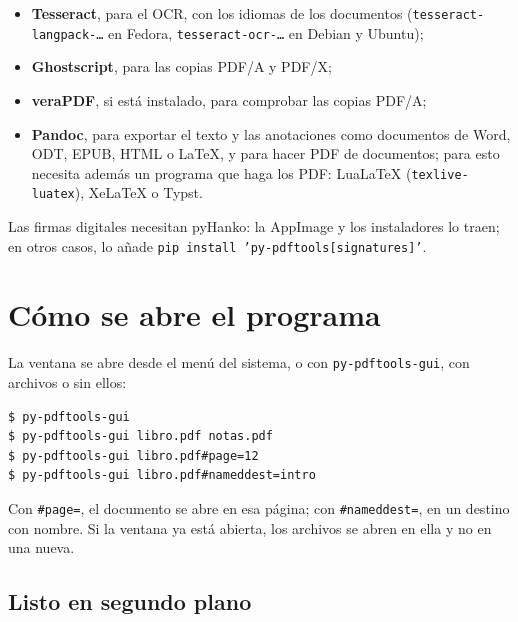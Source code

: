 \documentclass[12pt,
              article,
              oneside
              ]{memoir}
\begin{document}
%
\begin{itemize}
\item \textbf{Tesseract}, para el OCR, con los idiomas de los documentos
  (\texttt{tesseract-langpack-\ldots} en Fedora,
  \texttt{tesseract-ocr-\ldots} en Debian y Ubuntu);
\item \textbf{Ghostscript}, para las copias PDF/A y PDF/X;
\item \textbf{veraPDF}, si está instalado, para comprobar las copias PDF/A;
\item \textbf{Pandoc}, para exportar el texto y las anotaciones como
  documentos de Word, ODT, EPUB, HTML o LaTeX, y para hacer PDF de
  documentos; para esto necesita además un programa que haga los PDF:
  LuaLaTeX (\texttt{texlive-luatex}), XeLaTeX o Typst.
\end{itemize}

\noindent{}%
Las firmas digitales necesitan pyHanko: la AppImage y los
instaladores lo traen; en otros casos, lo añade
\texttt{pip install 'py-pdftools[signatures]'}.

\section{Cómo se abre el programa}

La ventana se abre desde el menú del sistema, o con
\texttt{py-pdftools-gui}, con archivos o sin ellos:

\begin{verbatim}
$ py-pdftools-gui
$ py-pdftools-gui libro.pdf notas.pdf
$ py-pdftools-gui libro.pdf#page=12
$ py-pdftools-gui libro.pdf#nameddest=intro
\end{verbatim}

\noindent{}%
Con \texttt{\#page=}, el documento se abre en esa página; con
\texttt{\#nameddest=}, en un destino con nombre. Si la ventana ya está
abierta, los archivos se abren en ella y no en una nueva.

\subsection{Listo en segundo plano}
\label{sec:background}
\end{document}
